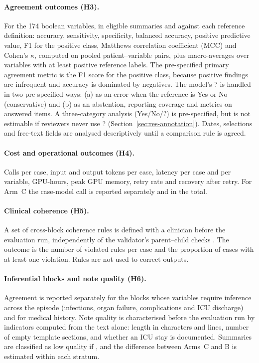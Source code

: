 \paragraph{Agreement outcomes (H3).} For the 174 boolean variables, in eligible summaries and against each
reference definition: accuracy, sensitivity, specificity, balanced accuracy, positive predictive value, F1
for the positive class, Matthews correlation coefficient (MCC) and Cohen's $\kappa$, computed on pooled
patient--variable pairs, plus macro-averages over variables with at least 
positive reference labels. The pre-specified primary agreement metric is the F1 score for the positive
class, because positive findings are infrequent and accuracy is dominated by negatives. The model's ? is
handled in two pre-specified ways: (a) as an error when the reference is Yes or No (conservative) and (b) as
an abstention, reporting coverage and metrics on answered items. A three-category analysis (Yes/No/?) is
pre-specified, but is not estimable if reviewers never use ? (Section~\ref{sec:res-annotation}). Dates,
selections and free-text fields are analysed descriptively until a comparison rule is agreed.

\paragraph{Cost and operational outcomes (H4).} Calls per case, input and output tokens per case, latency
per case and per variable, GPU-hours, peak GPU memory, retry rate and recovery after retry. For Arm~C the
case-model call is reported separately and in the total.

\paragraph{Clinical coherence (H5).} A set of cross-block coherence rules is defined with a clinician before
the evaluation run, independently of the validator's parent--child checks . The outcome is the number of violated rules per case and the proportion of
cases with at least one violation. Rules are not used to correct outputs.

\paragraph{Inferential blocks and note quality (H6).} Agreement is reported separately for the blocks whose
variables require inference across the episode (infections, organ failure, complications and ICU discharge)
and for medical history. Note quality is characterised before the evaluation run by indicators computed from
the text alone: length in characters and lines, number of empty template sections, and whether an ICU stay is
documented. Summaries are classified as low quality if , and the difference between Arms~C and B is estimated within
each stratum.

